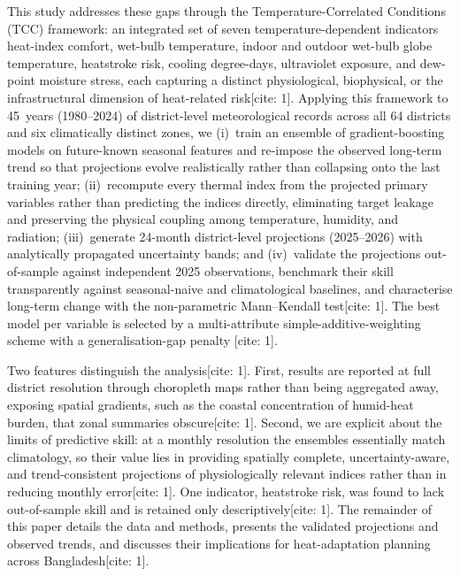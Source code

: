 \documentclass[pdflatex,sn-mathphys-ay]{sn-jnl}
\begin{document}
This study addresses these gaps through the Temperature-Correlated Conditions (TCC) framework: an integrated set of seven temperature-dependent indicators heat-index comfort, wet-bulb temperature, indoor and outdoor wet-bulb globe temperature, heatstroke risk, cooling degree-days, ultraviolet exposure, and dew-point moisture stress, each capturing a distinct physiological, biophysical, or the infrastructural dimension of heat-related risk[cite: 1]. Applying this framework to 45~years (1980--2024) of district-level meteorological records across all 64 districts and six climatically distinct zones, we (i)~train an ensemble of gradient-boosting models \citep{Breiman2001} on future-known seasonal features and re-impose the observed long-term trend so that projections evolve realistically rather than collapsing onto the last training year; (ii)~recompute every thermal index from the projected primary variables rather than predicting the indices directly, eliminating target leakage and preserving the physical coupling among temperature, humidity, and radiation; (iii)~generate 24-month district-level projections (2025--2026) with analytically propagated uncertainty bands; and (iv)~validate the projections out-of-sample against independent 2025 observations, benchmark their skill transparently against seasonal-naive and climatological baselines, and characterise long-term change with the non-parametric Mann--Kendall test[cite: 1]. The best model per variable is selected by a multi-attribute simple-additive-weighting scheme with a generalisation-gap penalty \citep{Hwang1981}[cite: 1].

Two features distinguish the analysis[cite: 1]. First, results are reported at full district resolution through choropleth maps rather than being aggregated away, exposing spatial gradients, such as the coastal concentration of humid-heat burden, that zonal summaries obscure[cite: 1]. Second, we are explicit about the limits of predictive skill: at a monthly resolution the ensembles essentially match climatology, so their value lies in providing spatially complete, uncertainty-aware, and trend-consistent projections of physiologically relevant indices rather than in reducing monthly error[cite: 1]. One indicator, heatstroke risk, was found to lack out-of-sample skill and is retained only descriptively[cite: 1]. The remainder of this paper details the data and methods, presents the validated projections and observed trends, and discusses their implications for heat-adaptation planning across Bangladesh[cite: 1].
\end{document}
